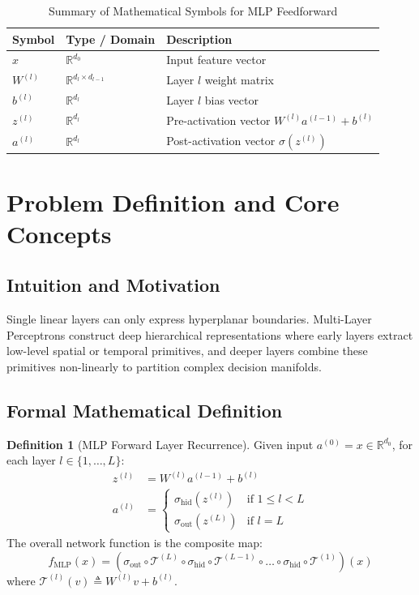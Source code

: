 \documentclass[11pt,a4paper]{article}
\theoremstyle{definition}
\newtheorem{definition}{Definition}[section]
\begin{document}
\begin{table}[h]
\centering
\caption{Summary of Mathematical Symbols for MLP Feedforward}
\begin{tabular}{lll}
\toprule
\textbf{Symbol} & \textbf{Type / Domain} & \textbf{Description} \\
\midrule
$x$ & $\mathbb{R}^{d_0}$ & Input feature vector \\
$W^{(l)}$ & $\mathbb{R}^{d_l \times d_{l-1}}$ & Layer $l$ weight matrix \\
$b^{(l)}$ & $\mathbb{R}^{d_l}$ & Layer $l$ bias vector \\
$z^{(l)}$ & $\mathbb{R}^{d_l}$ & Pre-activation vector $W^{(l)} a^{(l-1)} + b^{(l)}$ \\
$a^{(l)}$ & $\mathbb{R}^{d_l}$ & Post-activation vector $\sigma(z^{(l)})$ \\
\bottomrule
\end{tabular}
\end{table}

\section{Problem Definition and Core Concepts}

\subsection{Intuition and Motivation}
Single linear layers can only express hyperplanar boundaries. Multi-Layer Perceptrons construct deep hierarchical representations where early layers extract low-level spatial or temporal primitives, and deeper layers combine these primitives non-linearly to partition complex decision manifolds.

\subsection{Formal Mathematical Definition}
\begin{definition}[MLP Forward Layer Recurrence]
Given input $a^{(0)} = x \in \mathbb{R}^{d_0}$, for each layer $l \in \{1, \dots, L\}$:
\begin{align}
z^{(l)} &= W^{(l)} a^{(l-1)} + b^{(l)} \label{eq:mlp_z} \\
a^{(l)} &= \begin{cases}
\sigma_{\text{hid}}\left(z^{(l)}\right) & \text{if } 1 \le l < L \\
\sigma_{\text{out}}\left(z^{(L)}\right) & \text{if } l = L
\end{cases} \label{eq:mlp_a}
\end{align}
The overall network function is the composite map:
\begin{equation}
f_{\text{MLP}}(x) = \left( \sigma_{\text{out}} \circ \mathcal{T}^{(L)} \circ \sigma_{\text{hid}} \circ \mathcal{T}^{(L-1)} \circ \dots \circ \sigma_{\text{hid}} \circ \mathcal{T}^{(1)} \right)(x)
\end{equation}
where $\mathcal{T}^{(l)}(v) \triangleq W^{(l)} v + b^{(l)}$.
\end{definition}
\end{document}
